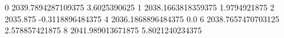 0 2039.7894287109375 3.6025390625
1 2038.1663818359375 1.9794921875
2 2035.875 -0.3118896484375
4 2036.1868896484375 0.0
6 2038.7657470703125 2.578857421875
8 2041.989013671875 5.8021240234375

